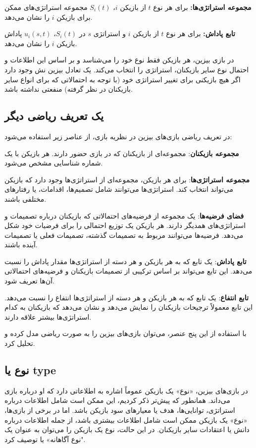 \textbf{مجموعه استراتژی‌ها:} برای هر نوع $t$ از بازیکن $i$، $S_i(t)$ مجموعه استراتژی‌های ممکن برای بازیکن $i$ را نشان می‌دهد.

\textbf{تابع پاداش:} برای هر نوع $t$ از بازیکن $i$ و استراتژی $s$ در $S_i(t)$، $u_i(s, t)$ پاداش بازیکن $i$ را نشان می‌دهد.

در بازی بیزین، هر بازیکن فقط نوع خود را می‌شناسد و بر اساس این اطلاعات و احتمال نوع سایر بازیکنان، استراتژی را انتخاب می‌کند. یک تعادل بیزین نش
وجود دارد اگر هیچ بازیکنی برای تغییر استراتژی خود (با توجه به احتمالاتی که برای انواع سایر بازیکنان در نظر گرفته) منفعتی نداشته باشد.


\subsection*{یک تعریف ریاضی دیگر}


در تعریف ریاضی بازی‌های بیزین در نظریه بازی، از عناصر زیر استفاده می‌شود:

\textbf{مجموعه بازیکنان}:
مجموعه‌ای از بازیکنان که در بازی حضور دارند. هر بازیکن با یک شماره شناسایی مشخص می‌شود.

\textbf{مجموعه استراتژی‌ها}:
برای هر بازیکن، مجموعه‌ای از استراتژی‌ها وجود دارد که بازیکن می‌تواند انتخاب کند. استراتژی‌ها می‌توانند شامل تصمیم‌ها، اقدامات، یا رفتارهای مختلفی باشند.

\textbf{فضای فرضیه‌ها}:
\lr{$\theta$}
یک مجموعه از فرضیه‌های احتمالاتی که بازیکنان درباره تصمیمات و استراتژی‌های همدیگر دارند. هر بازیکن یک توزیع احتمالی را برای فرضیات خود شکل می‌دهد. فرضیه‌ها می‌توانند مربوط به تصمیمات گذشته، تصمیمات فعلی یا تصمیمات آینده باشند.

\textbf{تابع پاداش}:
یک تابع که به هر بازیکن و هر دسته از استراتژی‌ها مقدار پاداش را نسبت می‌دهد. این تابع می‌تواند بر اساس ترکیبی از تصمیمات بازیکنان و فرضیه‌های احتمالاتی آن‌ها تعریف شود.

\textbf{تابع انتفاع}:
یک تابع که به هر بازیکن و هر دسته از استراتژی‌ها انتفاع را نسبت می‌دهد. این تابع معمولاً ترجیحات بازیکنان را نمایش می‌دهد و نشان می‌دهد که بازیکنان به کدام استراتژی‌ها بیشتر علاقه دارند.

با استفاده از این پنج عنصر، می‌توان بازی‌های بیزین را به صورت ریاضی مدل کرده و تحلیل کرد.


\subsection*{نوع یا type}

در بازی‌های بیزین، «نوع» یک بازیکن عموماً اشاره به اطلاعاتی دارد که او درباره بازی می‌داند. همانطور که پیش‌تر ذکر کردیم، این ممکن است شامل اطلاعات درباره استراتژی، توانایی‌ها، هدف یا معیارهای سود بازیکن باشد. اما در برخی از بازی‌ها، «نوع» یک بازیکن ممکن است شامل اطلاعات بیشتری باشد، از جمله اطلاعات درباره دانش یا اعتقادات سایر بازیکنان. در این حالت، نوع یک بازیکن را می‌توان به عنوان یک "نوع آگاهانه» یا 
توصیف کرد.

